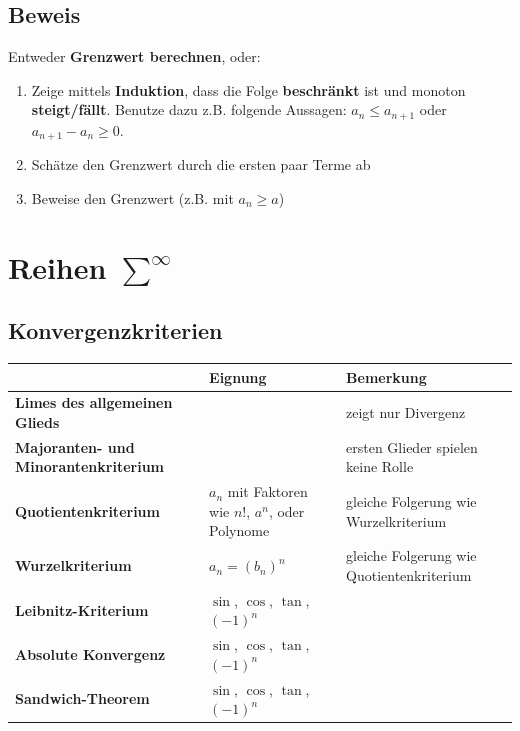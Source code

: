 \documentclass[11pt]{article}
\begin{document}
\subsection{Beweis}

Entweder \textbf{Grenzwert berechnen}, oder:

\begin{enumerate}[noitemsep]
	\item Zeige mittels \textbf{Induktion}, dass die Folge \textbf{beschr{\"a}nkt} ist und monoton \textbf{steigt/f{\"a}llt}. Benutze dazu z.B. folgende Aussagen: $a_n \leq a_{n+1}$ oder $a_{n+1}-a_n \geq 0$.
	\item Sch{\"a}tze den Grenzwert durch die ersten paar Terme ab
	\item Beweise den Grenzwert (z.B. mit $a_n \geq a$)
\end{enumerate}

\section{Reihen $\sum^\infty$}

\subsection{Konvergenzkriterien}

\begin{table}[H]
\centering
\begin{tabular}{|p{5cm}|p{4cm}|p{5cm}|}
\hline
                                             & \textbf{Eignung}    & \textbf{Bemerkung}                        \\ \hline
\textbf{Limes des allgemeinen Glieds}        &                     & zeigt nur Divergenz                       \\ \hline
\textbf{Majoranten- und Minorantenkriterium} &                     & ersten Glieder spielen keine Rolle        \\ \hline
\textbf{Quotientenkriterium}                 & $a_n$ mit Faktoren wie $n!$, $a^n$, oder Polynome & gleiche Folgerung wie Wurzelkriterium     \\ \hline
\textbf{Wurzelkriterium}                     & $a_n = (b_n)^n$     & gleiche Folgerung wie Quotientenkriterium \\ \hline
\textbf{Leibnitz-Kriterium}                  & $\sin$, $\cos$, $\tan$, $(-1)^n$ &                                           \\ \hline
\textbf{Absolute Konvergenz}                 & $\sin$, $\cos$, $\tan$, $(-1)^n$   &                                           \\ \hline
\textbf{Sandwich-Theorem}					 & $\sin$, $\cos$, $\tan$, $(-1)^n$ & \\ \hline
\end{tabular}
\end{table}
\end{document}
